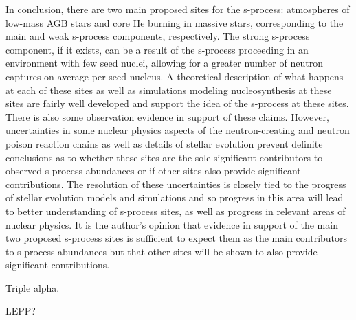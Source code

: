 In conclusion, there are two main proposed sites for the s-process:
atmospheres of low-mass AGB stars and core He burning in massive
stars, corresponding to the main and weak s-process components,
respectively.  The strong s-process component, if it exists, can be a
result of the s-process proceeding in an environment with few seed
nuclei, allowing for a greater number of neutron captures on average
per seed nucleus.  A theoretical description of what happens at each
of these sites as well as simulations modeling nucleosynthesis at
these sites are fairly well developed and support the idea of
the s-process at these sites.  There is also some observation evidence
in support of these claims.  However, uncertainties in some nuclear
physics aspects of the neutron-creating and neutron poison reaction
chains as well as details of stellar evolution prevent definite
conclusions as to whether these sites are the sole significant
contributors to observed s-process abundances or if other sites also
provide significant contributions.  The resolution of these
uncertainties is closely tied to the progress of stellar evolution
models and simulations and so progress in this area will lead to
better understanding of s-process sites, as well as progress in
relevant areas of nuclear physics.  It is the author's opinion that
evidence in support of the main two proposed s-process sites is
sufficient to expect them as the main contributors to s-process
abundances but that other sites will be shown to also provide
significant contributions.




Triple alpha.

LEPP?
